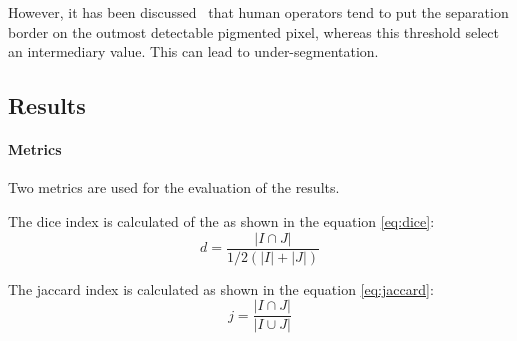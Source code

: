 \documentclass[a4paper,10pt]{article}
\begin{document}
However, it has been discussed~\cite{celebi_lesion_2009} that human operators tend to put the separation border on the outmost detectable pigmented pixel, whereas this threshold select an intermediary value. This can lead to under-segmentation. 



\subsection{Results} \label{results-otsu}

\paragraph{Metrics}
Two metrics are used for the evaluation of the results.

The dice index is calculated of the as shown in the equation \ref{eq:dice}:
\begin{equation} \label{eq:dice}
d=\frac{|I \cap J|}{1/2(|I| + |J|)} 
\end{equation}

The jaccard index is calculated as shown in the equation \ref{eq:jaccard}:
\begin{equation} \label{eq:jaccard}
j=\frac{|I \cap J|}{|I \cup J|} 
\end{equation}
\end{document}
